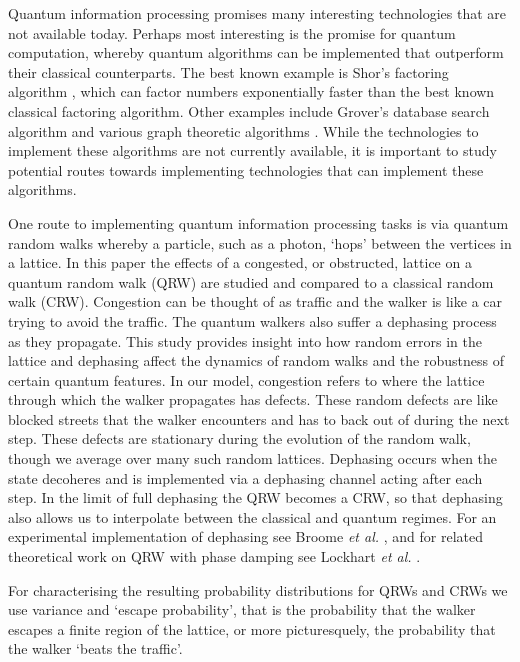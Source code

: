 \documentclass[aps,pra,twocolumn,amsmath,amssymb,nofootinbib,superscriptaddress]{revtex4}
\begin{document}
Quantum information processing \cite{bib:NielsenChuang00} promises many interesting technologies that are not available today. Perhaps most interesting is the promise for quantum computation, whereby quantum algorithms can be implemented that outperform their classical counterparts. The best known example is Shor's factoring algorithm \cite{bib:Shor97}, which can factor numbers exponentially faster than the best known classical factoring algorithm. Other examples include Grover's database search algorithm \cite{bib:Grover96} and various graph theoretic algorithms \cite{bib:Ambainis2003, PhysRevA.81.052313, PhysRevA.83.042317}. While the technologies to implement these algorithms are not currently available, it is important to study potential routes towards implementing technologies that can implement these algorithms. 

One route to implementing quantum information processing tasks is via quantum random walks \cite{bib:ADZ, bib:AAKV, bib:Kempe08, bib:Salvador12} whereby a particle, such as a photon, `hops' between the vertices in a lattice. In this paper the effects of a congested, or obstructed, lattice on a quantum random walk (QRW) are studied and compared to a classical random walk (CRW). Congestion can be thought of as traffic and the walker is like a car trying to avoid the traffic. The quantum walkers also suffer a dephasing process as they propagate. This study provides insight into how random errors in the lattice and dephasing affect the dynamics of random walks and the robustness of certain quantum features. In our model, congestion refers to where the lattice through which the walker  propagates has defects. These random defects are like blocked streets that the walker encounters and has to back out of during the next step. These defects are stationary during the evolution of the random walk, though we average over many such random lattices. Dephasing occurs when the state decoheres and is implemented via a dephasing channel acting after each step. In the limit of full dephasing the QRW becomes a CRW, so that dephasing also allows us to interpolate between the classical and quantum regimes. For an experimental implementation of dephasing see Broome \emph{et al.} \cite{bib:PhysRevLett.104.153602}, and for related theoretical work on QRW with phase damping see Lockhart \emph{et al.} \cite{bib:lockhart2013performance}.

For characterising the resulting probability distributions for QRWs and CRWs we use variance and `escape probability', that is the probability that the walker escapes a finite region of the lattice, or more picturesquely, the probability that the walker `beats the traffic'.
\end{document}
